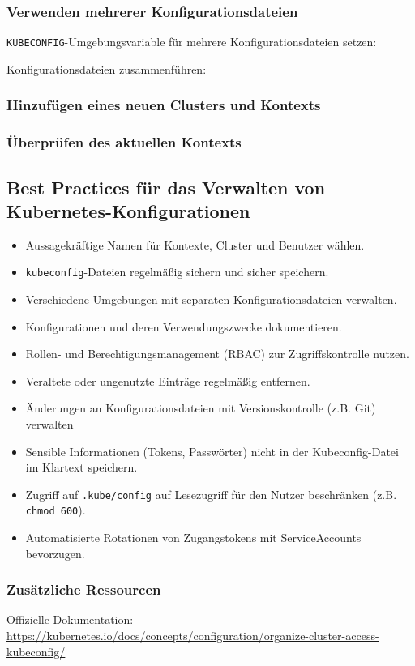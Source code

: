\subsubsection{Verwenden mehrerer Konfigurationsdateien}
\texttt{KUBECONFIG}-Umgebungsvariable für mehrere Konfigurationsdateien setzen:

\noindent
Konfigurationsdateien zusammenführen:

\subsubsection{Hinzufügen eines neuen Clusters und Kontexts}

\subsubsection{Überprüfen des aktuellen Kontexts}

\subsection{Best Practices für das Verwalten von Kubernetes-Konfigurationen}
\begin{itemize}
    \item Aussagekräftige Namen für Kontexte, Cluster und Benutzer wählen.
    \item \texttt{kubeconfig}-Dateien regelmäßig sichern und sicher speichern.
    \item Verschiedene Umgebungen mit separaten Konfigurationsdateien verwalten.
    \item Konfigurationen und deren Verwendungszwecke dokumentieren.
    \item Rollen- und Berechtigungsmanagement (RBAC) zur Zugriffskontrolle nutzen.
    \item Veraltete oder ungenutzte Einträge regelmäßig entfernen.
    \item Änderungen an Konfigurationsdateien mit Versionskontrolle (z.B. Git) verwalten
    \item Sensible Informationen (Tokens, Passwörter) nicht in der Kubeconfig-Datei im Klartext speichern.
    \item Zugriff auf \texttt{.kube/config} auf Lesezugriff für den Nutzer beschränken (z.B. \texttt{chmod 600}).
    \item Automatisierte Rotationen von Zugangstokens mit ServiceAccounts bevorzugen.
\end{itemize}
\subsubsection{Zusätzliche Ressourcen}
Offizielle Dokumentation: \url{https://kubernetes.io/docs/concepts/configuration/organize-cluster-access-kubeconfig/}

